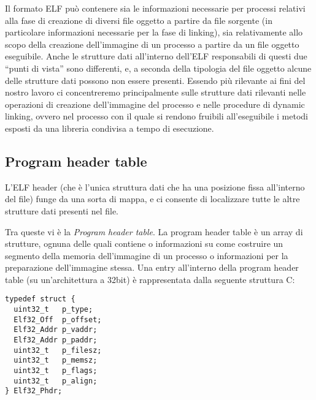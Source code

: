 Il formato ELF può contenere sia le informazioni necessarie per
processi relativi alla fase di creazione di diversi file oggetto a
partire da file sorgente (in particolare informazioni necessarie per
la fase di linking), sia relativamente allo scopo della creazione
dell'immagine di un processo a partire da un file oggetto
eseguibile. Anche le strutture dati all'interno dell'ELF responsabili
di questi due ``punti di vista'' sono differenti, e, a seconda della
tipologia del file oggetto alcune delle strutture dati possono non
essere presenti. Essendo più rilevante ai fini del nostro lavoro ci
concentreremo principalmente sulle strutture dati rilevanti nelle
operazioni di creazione dell'immagine del processo e nelle procedure
di dynamic linking, ovvero nel processo con il quale si rendono
fruibili all'eseguibile i metodi esposti da una libreria condivisa a
tempo di esecuzione.

\subsection{Program header table}
\label{sec:plt}

L'ELF header (che è l'unica struttura dati che ha una posizione fissa
all'interno del file) funge da una sorta di mappa, e ci consente di
localizzare tutte le altre strutture dati presenti nel file.

Tra queste vi è la \emph{Program header table}. La program header
table è un array di strutture, ognuna delle quali contiene o
informazioni su come costruire un segmento della memoria dell'immagine
di un processo o informazioni per la preparazione dell'immagine
stessa. Una entry all'interno della program header table (su
un'architettura a 32bit) è rappresentata dalla seguente struttura C:

\begin{lstlisting}[caption=program header table entry]
typedef struct {
  uint32_t   p_type;
  Elf32_Off  p_offset;
  Elf32_Addr p_vaddr;
  Elf32_Addr p_paddr;
  uint32_t   p_filesz;
  uint32_t   p_memsz;
  uint32_t   p_flags;
  uint32_t   p_align;
} Elf32_Phdr;
\end{lstlisting}


